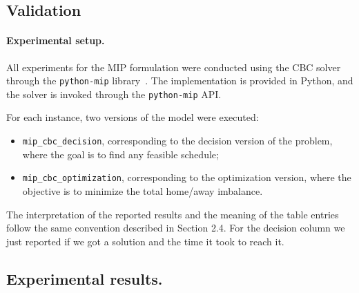 \subsection{Validation}

\paragraph{Experimental setup.}
All experiments for the MIP formulation were conducted using the CBC solver
through the \texttt{python-mip} library~\cite{pythonmip}. The implementation is
provided in Python, and the solver is invoked through the \texttt{python-mip}
API.

For each instance, two versions of the model were executed:
\begin{itemize}
    \item \texttt{mip\_cbc\_decision}, corresponding to the decision version of
    the problem, where the goal is to find any feasible schedule;
    \item \texttt{mip\_cbc\_optimization}, corresponding to the optimization
    version, where the objective is to minimize the total home/away imbalance.
\end{itemize}


The interpretation of the reported results and the
meaning of the table entries follow the same convention described
in Section 2.4. For the decision column we just reported if we got a solution and the time it took to reach it.
\subsection{Experimental results.}



